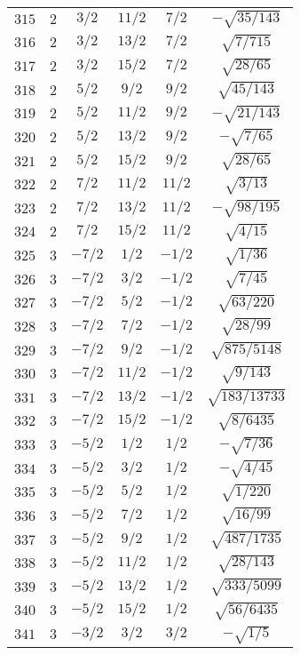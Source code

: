 \begin{table}
\begin{center}
\begin{tabular}{|c|c|c|c|c|c|}
$315$ & $2$ & $3/2$ & $11/2$ & $7/2$ & $-\sqrt{35/143}$ \\ 
$316$ & $2$ & $3/2$ & $13/2$ & $7/2$ & $\sqrt{7/715}$ \\ 
$317$ & $2$ & $3/2$ & $15/2$ & $7/2$ & $\sqrt{28/65}$ \\ 
$318$ & $2$ & $5/2$ & $9/2$ & $9/2$ & $\sqrt{45/143}$ \\ 
$319$ & $2$ & $5/2$ & $11/2$ & $9/2$ & $-\sqrt{21/143}$ \\ 
$320$ & $2$ & $5/2$ & $13/2$ & $9/2$ & $-\sqrt{7/65}$ \\ 
$321$ & $2$ & $5/2$ & $15/2$ & $9/2$ & $\sqrt{28/65}$ \\ 
$322$ & $2$ & $7/2$ & $11/2$ & $11/2$ & $\sqrt{3/13}$ \\ 
$323$ & $2$ & $7/2$ & $13/2$ & $11/2$ & $-\sqrt{98/195}$ \\ 
$324$ & $2$ & $7/2$ & $15/2$ & $11/2$ & $\sqrt{4/15}$ \\ 
$325$ & $3$ & $-7/2$ & $1/2$ & $-1/2$ & $\sqrt{1/36}$ \\ 
$326$ & $3$ & $-7/2$ & $3/2$ & $-1/2$ & $\sqrt{7/45}$ \\ 
$327$ & $3$ & $-7/2$ & $5/2$ & $-1/2$ & $\sqrt{63/220}$ \\ 
$328$ & $3$ & $-7/2$ & $7/2$ & $-1/2$ & $\sqrt{28/99}$ \\ 
$329$ & $3$ & $-7/2$ & $9/2$ & $-1/2$ & $\sqrt{875/5148}$ \\ 
$330$ & $3$ & $-7/2$ & $11/2$ & $-1/2$ & $\sqrt{9/143}$ \\ 
$331$ & $3$ & $-7/2$ & $13/2$ & $-1/2$ & $\sqrt{183/13733}$ \\ 
$332$ & $3$ & $-7/2$ & $15/2$ & $-1/2$ & $\sqrt{8/6435}$ \\ 
$333$ & $3$ & $-5/2$ & $1/2$ & $1/2$ & $-\sqrt{7/36}$ \\ 
$334$ & $3$ & $-5/2$ & $3/2$ & $1/2$ & $-\sqrt{4/45}$ \\ 
$335$ & $3$ & $-5/2$ & $5/2$ & $1/2$ & $\sqrt{1/220}$ \\ 
$336$ & $3$ & $-5/2$ & $7/2$ & $1/2$ & $\sqrt{16/99}$ \\ 
$337$ & $3$ & $-5/2$ & $9/2$ & $1/2$ & $\sqrt{487/1735}$ \\ 
$338$ & $3$ & $-5/2$ & $11/2$ & $1/2$ & $\sqrt{28/143}$ \\ 
$339$ & $3$ & $-5/2$ & $13/2$ & $1/2$ & $\sqrt{333/5099}$ \\ 
$340$ & $3$ & $-5/2$ & $15/2$ & $1/2$ & $\sqrt{56/6435}$ \\ 
$341$ & $3$ & $-3/2$ & $3/2$ & $3/2$ & $-\sqrt{1/5}$ \\ 

\end{tabular}
\end{center}
\end{table}
